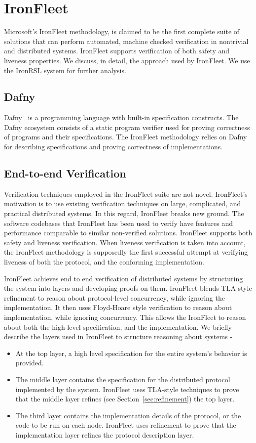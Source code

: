 \documentclass{llncs}
\begin{document}
\section{IronFleet}
Microsoft's IronFleet methodology, is claimed to be the first complete suite of 
solutions that can perform automated, machine checked verification 
in nontrivial and distributed systems. IronFleet supports 
verification of both safety and liveness properties. We discuss, in detail, the 
approach used by IronFleet. We use the IronRSL system for further analysis.

\subsection{Dafny}
Dafny~\cite{leino-dafny} is a programming language with built-in specification constructs.
The Dafny
ecosystem consists of a static program verifier used for proving correctness of
programs and their specifications. The IronFleet methodology relies 
on Dafny for describing specifications and proving correctness of implementations. 

\subsection{End-to-end Verification}
Verification techniques employed in the IronFleet suite are not novel. IronFleet's 
motivation is to use existing verification techniques on large, complicated, and practical distributed
systems. In this regard, IronFleet breaks new ground. The software codebases that IronFleet
has been used to verify have features and performance comparable to similar non-verified solutions. 
IronFleet supports both safety and liveness verification. When liveness verification is taken into account, 
the IronFleet methodology is supposedly the first successful attempt at verifying liveness of both
the protocol, and the conforming implementation. 

IronFleet achieves end to end verification of distributed systems by structuring the system into layers and 
developing proofs on them. IronFleet blends TLA-style refinement to reason about protocol-level concurrency, 
while ignoring the implementation. It then uses Floyd-Hoare style verification to reason about implementation,
while ignoring concurrency. This allows the IronFleet to reason about both the high-level specification, and
the implementation. We briefly describe the layers used in IronFleet to structure reasoning about systems - 
\begin{itemize}
\item At the top layer, a high level specification for the entire system's behavior is provided. 
\item The middle layer contains the specification for the distributed protocol implemented by the
    system. IronFleet uses TLA-style techniques to prove that the middle layer 
    refines (see Section~\ref{sec:refinement}) the top layer.
\item The third layer contains the implementation details of the protocol, or the code to be run on each node.
    IronFleet uses refinement to prove that the implementation layer refines the protocol description layer. 
\end{itemize}
\end{document}
